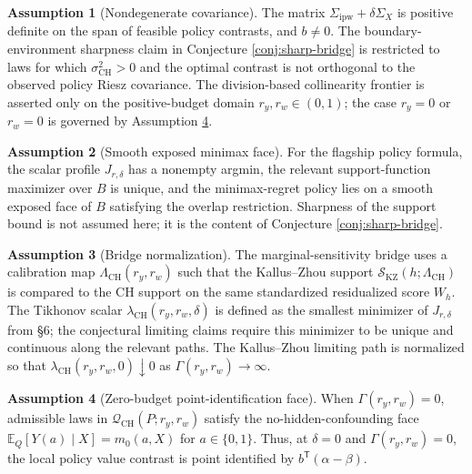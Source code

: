 \documentclass[11pt]{article}
\newcommand{\E}{\mathbb{E}}
\newcommand{\transpose}{\mathsf{T}}
\theoremstyle{definition}
\newtheorem{assumption}{Assumption}
\theoremstyle{plain}
\theoremstyle{remark}
\begin{document}
\begin{assumption}[Nondegenerate covariance]\label{ass:nondegenerate}
The matrix $\Sigma_{\mathrm{ipw}}+\delta\Sigma_X$ is positive definite on the span of feasible policy contrasts, and $b\ne0$. The boundary-environment sharpness claim in Conjecture \ref{conj:sharp-bridge} is restricted to laws for which $\sigma_{\mathrm{CH}}^2>0$ and the optimal contrast is not orthogonal to the observed policy Riesz covariance.
The division-based collinearity frontier is asserted only on the positive-budget domain $r_y,r_w\in(0,1)$; the case $r_y=0$ or $r_w=0$ is governed by Assumption \ref{ass:zero-budget-face}.
\end{assumption}

\begin{assumption}[Smooth exposed minimax face]\label{ass:smooth-face}
For the flagship policy formula, the scalar profile $J_{r,\delta}$ has a nonempty argmin, the relevant support-function maximizer over $B$ is unique, and the minimax-regret policy lies on a smooth exposed face of $B$ satisfying the overlap restriction. Sharpness of the support bound is not assumed here; it is the content of Conjecture \ref{conj:sharp-bridge}.
\end{assumption}

\begin{assumption}[Bridge normalization]\label{ass:bridge-normalization}
The marginal-sensitivity bridge uses a calibration map $\Lambda_{\mathrm{CH}}(r_y,r_w)$ such that the Kallus--Zhou support $\mathcal S_{\mathrm{KZ}}(h;\Lambda_{\mathrm{CH}})$ is compared to the CH support on the same standardized residualized score $W_h$. The Tikhonov scalar $\lambda_{\mathrm{CH}}(r_y,r_w,\delta)$ is defined as the smallest minimizer of $J_{r,\delta}$ from \S6; the conjectural limiting claims require this minimizer to be unique and continuous along the relevant paths. The Kallus--Zhou limiting path is normalized so that $\lambda_{\mathrm{CH}}(r_y,r_w,0)\downarrow0$ as $\Gamma(r_y,r_w)\to\infty$.
\end{assumption}

\begin{assumption}[Zero-budget point-identification face]\label{ass:zero-budget-face}
When $\Gamma(r_y,r_w)=0$, admissible laws in $\mathcal Q_{\mathrm{CH}}(P;r_y,r_w)$ satisfy the no-hidden-confounding face
$\E_Q[Y(a)\mid X]=m_0(a,X)$ for $a\in\{0,1\}$. Thus, at $\delta=0$ and $\Gamma(r_y,r_w)=0$, the local policy value contrast is point identified by $b^\transpose(\alpha-\beta)$.
\end{assumption}
\end{document}
